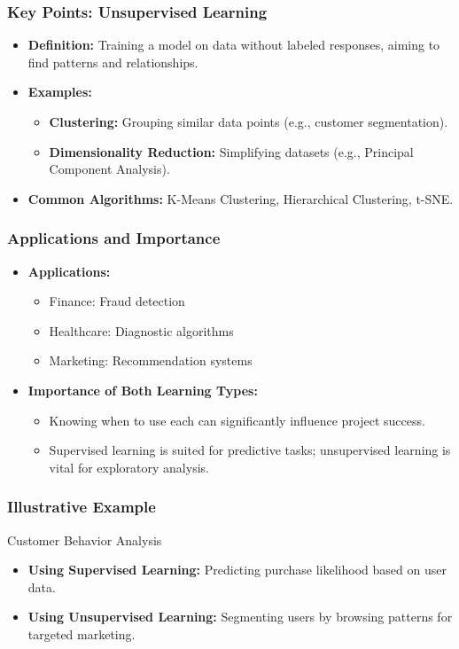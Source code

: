 \documentclass[aspectratio=169]{beamer}
\begin{document}
\begin{frame}[fragile]
    \frametitle{Key Points: Unsupervised Learning}
    
    \begin{itemize}
        \item \textbf{Definition:} Training a model on data without labeled responses, aiming to find patterns and relationships.
        \item \textbf{Examples:}
        \begin{itemize}
            \item \textbf{Clustering:} Grouping similar data points (e.g., customer segmentation).
            \item \textbf{Dimensionality Reduction:} Simplifying datasets (e.g., Principal Component Analysis).
        \end{itemize}
        \item \textbf{Common Algorithms:} K-Means Clustering, Hierarchical Clustering, t-SNE.
    \end{itemize}
\end{frame}

\begin{frame}[fragile]
    \frametitle{Applications and Importance}
    
    \begin{itemize}
        \item \textbf{Applications:} 
        \begin{itemize}
            \item Finance: Fraud detection
            \item Healthcare: Diagnostic algorithms
            \item Marketing: Recommendation systems
        \end{itemize}
        \item \textbf{Importance of Both Learning Types:} 
        \begin{itemize}
            \item Knowing when to use each can significantly influence project success.
            \item Supervised learning is suited for predictive tasks; unsupervised learning is vital for exploratory analysis.
        \end{itemize}
    \end{itemize}
\end{frame}

\begin{frame}[fragile]
    \frametitle{Illustrative Example}
    
    \begin{block}{Customer Behavior Analysis}
        \begin{itemize}
            \item \textbf{Using Supervised Learning:} Predicting purchase likelihood based on user data.
            \item \textbf{Using Unsupervised Learning:} Segmenting users by browsing patterns for targeted marketing.
        \end{itemize}
    \end{block}
\end{frame}
\end{document}
